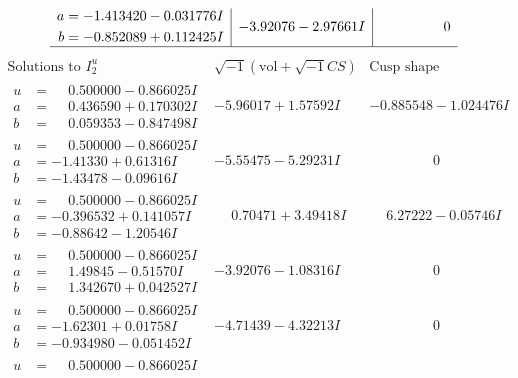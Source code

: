 \documentclass[1p]{elsarticle_modified}
\theoremstyle{definition}
\newcommand{\I}{\sqrt{-1}}
\begin{document}
$$\begin{array}{c|c|c}
\begin{aligned}
a &= -1.413420 - 0.031776 I \\
b &= -0.852089 + 0.112425 I\end{aligned}
 & -3.92076 - 2.97661 I & \phantom{-0.000000 } 0\\
 \hline 
 \end{array}$$\newpage$$\begin{array}{c|c|c}  
\text{Solutions to }I^u_{2}& \I (\text{vol} + \sqrt{-1}CS) & \text{Cusp shape}\\
 \hline 
\begin{aligned}
u &= \phantom{-}0.500000 - 0.866025 I \\
a &= \phantom{-}0.436590 + 0.170302 I \\
b &= \phantom{-}0.059353 - 0.847498 I\end{aligned}
 & -5.96017 + 1.57592 I & -0.885548 - 1.024476 I \\ \hline\begin{aligned}
u &= \phantom{-}0.500000 - 0.866025 I \\
a &= -1.41330 + 0.61316 I \\
b &= -1.43478 - 0.09616 I\end{aligned}
 & -5.55475 - 5.29231 I & \phantom{-0.000000 } 0 \\ \hline\begin{aligned}
u &= \phantom{-}0.500000 - 0.866025 I \\
a &= -0.396532 + 0.141057 I \\
b &= -0.88642 - 1.20546 I\end{aligned}
 & \phantom{-}0.70471 + 3.49418 I & \phantom{-}6.27222 - 0.05746 I \\ \hline\begin{aligned}
u &= \phantom{-}0.500000 - 0.866025 I \\
a &= \phantom{-}1.49845 - 0.51570 I \\
b &= \phantom{-}1.342670 + 0.042527 I\end{aligned}
 & -3.92076 - 1.08316 I & \phantom{-0.000000 } 0 \\ \hline\begin{aligned}
u &= \phantom{-}0.500000 - 0.866025 I \\
a &= -1.62301 + 0.01758 I \\
b &= -0.934980 - 0.051452 I\end{aligned}
 & -4.71439 - 4.32213 I & \phantom{-0.000000 } 0 \\ \hline\begin{aligned}
u &= \phantom{-}0.500000 - 0.866025 I \\

\end{aligned}
\end{array}$$
\end{document}
